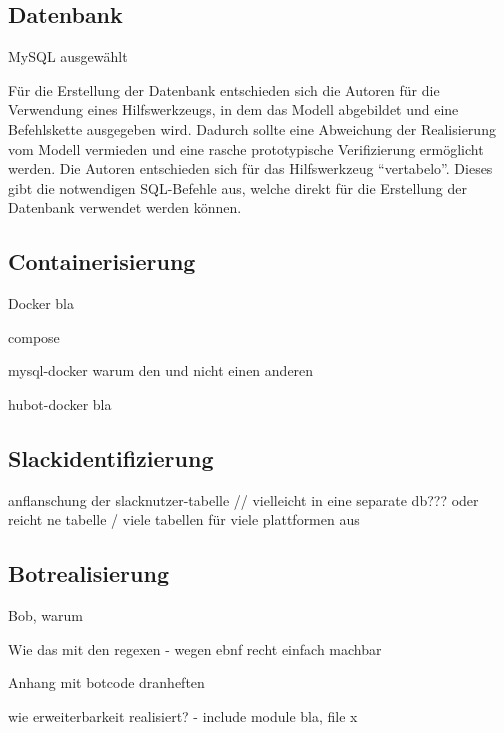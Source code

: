 \subsection{Datenbank}

MySQL ausgewählt



Für die Erstellung der Datenbank entschieden sich die Autoren für die Verwendung eines Hilfswerkzeugs, in dem das Modell abgebildet und eine Befehlskette ausgegeben wird. Dadurch sollte eine Abweichung der Realisierung vom Modell vermieden und eine rasche prototypische Verifizierung ermöglicht werden. Die Autoren entschieden sich für das Hilfswerkzeug \enquote{vertabelo}. Dieses gibt die notwendigen SQL-Befehle aus, welche direkt für die Erstellung der Datenbank verwendet werden können.





\subsection{Containerisierung}

Docker bla

compose

mysql-docker warum den und nicht einen anderen

hubot-docker bla



\subsection{Slackidentifizierung}

anflanschung der slacknutzer-tabelle // vielleicht in eine separate db??? oder reicht ne tabelle / viele tabellen für viele plattformen aus

\subsection{Botrealisierung}

Bob, warum

Wie das mit den regexen - wegen ebnf recht einfach machbar

Anhang mit botcode dranheften

wie erweiterbarkeit realisiert? - include module bla, file x